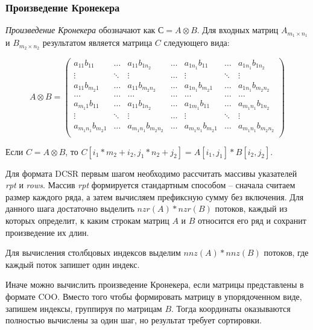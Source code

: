 \documentclass[14pt]{extarticle}
\newcommand{\txt}{\textit}
\begin{document}
	\subsubsection{Произведение Кронекера}\label{kron}
	
	
	\emph{Произведение Кронекера} обозначают как $С = A\otimes B$. Для входных матриц $A_{m_1 \times n_1}$ и $B_{m_2 \times n_2}$ результатом является матрица $C$ следующего вида:
	
	$$
	A\otimes B = \begin{pmatrix}
		
		a_{11}b_{11} & \dots & a_{11}b_{1n_2} & \dots & a_{1n_1}b_{11} & \dots & a_{1n_1}b_{1n_2}\\
		\vdots & \ddots & \vdots & \dots & \vdots & \ddots & \vdots \\
		a_{11}b_{m_{2}1} & \dots & a_{11}b_{m_2n_2} & \dots & a_{1n_1}b_{m_{2}1} & \dots & a_{1n_1}b_{m_2n_2}\\
		\dots & \dots & \dots & \dots & \dots & \dots & \dots \\
		a_{m_{1}1}b_{11} & \dots & a_{11}b_{1n_2} & \dots & a_{1m_1}b_{11} & \dots & a_{m_1n_1}b_{1n_2}\\
		\vdots & \ddots & \vdots & \dots & \vdots & \ddots & \vdots \\
		a_{m_1n_1}b_{m_{2}1} & \dots & a_{m_1n_1}b_{m_2n_2} & \dots & a_{m_1n_1}b_{m_{2}1} & \dots & a_{m_1n_1}b_{m_2n_2}\\
	\end{pmatrix}$$
	
	Если $C = A\otimes B$, то $C[i_1 * m_2 + i_2, j_1 * n_2 + j_2] = A[i_1, j_1] * B[i_2, j_2]$.
	
	Для формата DCSR первым шагом необходимо рассчитать массивы указателей \txt{rpt} и \txt{rows}. Массив \txt{rpt} формируется стандартным способом -- сначала считаем размер каждого ряда, а затем вычисляем префиксную сумму без включения. Для данного шага достаточно выделить $nzr(A) * nzr(B)$ потоков, каждый из которых определит, к каким строкам матриц $A$ и $B$ относится его ряд и сохранит произведение их длин.  
	
	Для вычисления столбцовых индексов выделим $nnz(A) * nnz(B)$ потоков, где каждый поток запишет один индекс.
	
	Иначе можно вычислить произведение Кронекера, если матрицы представлены в формате COO. Вместо того чтобы формировать матрицу в упорядоченном виде, запишем индексы, группируя по матрицам $B$. Тогда координаты оказываются полностью вычислены за один шаг, но результат требует сортировки.
	
\end{document}
